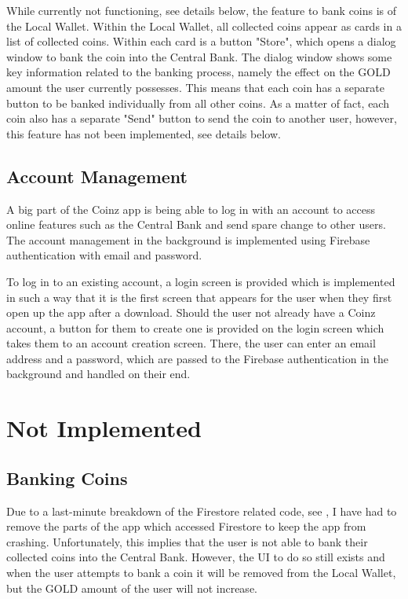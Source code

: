 \documentclass[11pt,a4paper,notitlepage]{article}
\begin{document}
    While currently not functioning, see details below, the feature to bank coins is of the Local Wallet. Within the Local Wallet, all collected coins appear as cards in a list of collected coins. Within each card is a button "Store", which opens a dialog window to bank the coin into the Central Bank. The dialog window shows some key information related to the banking process, namely the effect on the GOLD amount the user currently possesses. This means that each coin has a separate button to be banked individually from all other coins. As a matter of fact, each coin also has a separate "Send" button to send the coin to another user, however, this feature has not been implemented, see details below.

\subsection{Account Management}

    A big part of the Coinz app is being able to log in with an account to access online features such as the Central Bank and send spare change to other users. The account management in the background is implemented using Firebase authentication with email and password.

    To log in to an existing account, a login screen is provided which is implemented in such a way that it is the first screen that appears for the user when they first open up the app after a download. Should the user not already have a Coinz account, a button for them to create one is provided on the login screen which takes them to an account creation screen. There, the user can enter an email address and a password, which are passed to the Firebase authentication in the background and handled on their end.

\section{Not Implemented}

\subsection{Banking Coins}

    Due to a last-minute breakdown of the Firestore related code, see \cite{firestore-issue}, I have had to remove the parts of the app which accessed Firestore to keep the app from crashing. Unfortunately, this implies that the user is not able to bank their collected coins into the Central Bank. However, the UI to do so still exists and when the user attempts to bank a coin it will be removed from the Local Wallet, but the GOLD amount of the user will not increase.
\end{document}

